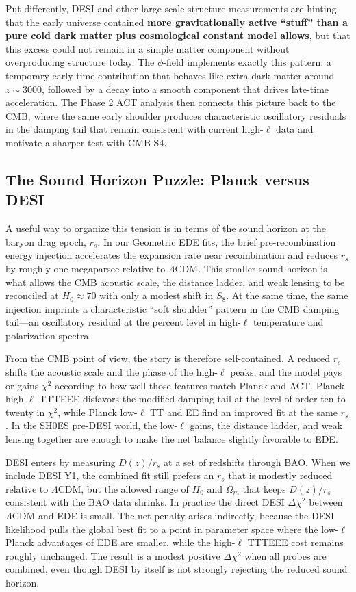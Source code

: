 \documentclass[a4paper,11pt]{article}
\begin{document}
Put differently, DESI and other large-scale structure measurements are hinting that the early universe contained \textbf{more gravitationally active ``stuff'' than a pure cold dark matter plus cosmological constant model allows}, but that this excess could not remain in a simple matter component without overproducing structure today. The $\phi$-field implements exactly this pattern: a temporary early-time contribution that behaves like extra dark matter around $z \sim 3000$, followed by a decay into a smooth component that drives late-time acceleration. The Phase 2 ACT analysis then connects this picture back to the CMB, where the same early shoulder produces characteristic oscillatory residuals in the damping tail that remain consistent with current high-$\ell$ data and motivate a sharper test with CMB-S4.

\subsection*{The Sound Horizon Puzzle: Planck versus DESI}

A useful way to organize this tension is in terms of the sound horizon at the baryon drag epoch, $r_s$. In our Geometric EDE fits, the brief pre-recombination energy injection accelerates the expansion rate near recombination and reduces $r_s$ by roughly one megaparsec relative to $\Lambda$CDM. This smaller sound horizon is what allows the CMB acoustic scale, the distance ladder, and weak lensing to be reconciled at $H_0 \approx 70$ with only a modest shift in $S_8$. At the same time, the same injection imprints a characteristic ``soft shoulder'' pattern in the CMB damping tail---an oscillatory residual at the percent level in high-$\ell$ temperature and polarization spectra.

From the CMB point of view, the story is therefore self-contained. A reduced $r_s$ shifts the acoustic scale and the phase of the high-$\ell$ peaks, and the model pays or gains $\chi^2$ according to how well those features match Planck and ACT. Planck high-$\ell$ TTTEEE disfavors the modified damping tail at the level of order ten to twenty in $\chi^2$, while Planck low-$\ell$ TT and EE find an improved fit at the same $r_s$. In the SH0ES pre-DESI world, the low-$\ell$ gains, the distance ladder, and weak lensing together are enough to make the net balance slightly favorable to EDE.

DESI enters by measuring $D(z)/r_s$ at a set of redshifts through BAO. When we include DESI Y1, the combined fit still prefers an $r_s$ that is modestly reduced relative to $\Lambda$CDM, but the allowed range of $H_0$ and $\Omega_m$ that keeps $D(z)/r_s$ consistent with the BAO data shrinks. In practice the direct DESI $\Delta\chi^2$ between $\Lambda$CDM and EDE is small. The net penalty arises indirectly, because the DESI likelihood pulls the global best fit to a point in parameter space where the low-$\ell$ Planck advantages of EDE are smaller, while the high-$\ell$ TTTEEE cost remains roughly unchanged. The result is a modest positive $\Delta\chi^2$ when all probes are combined, even though DESI by itself is not strongly rejecting the reduced sound horizon.
\end{document}
